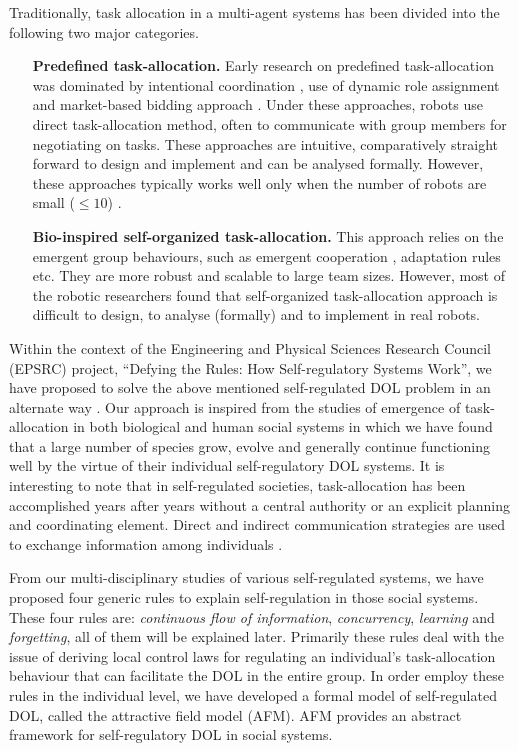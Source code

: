 \documentclass{intech}
\begin{document}
Traditionally, task allocation in a multi-agent systems has been divided into the following two major categories.
\begin{enumerate}
\item[\textbf{Predefined task-allocation.}]
Early research on predefined task-allocation was dominated by intentional coordination \citep{Parker2008}, use of dynamic role assignment \citep{Chaimowicz2002} and market-based bidding approach \citep{Dias+2006}. Under these approaches, robots use direct task-allocation method, often to communicate with group members for negotiating on tasks. These approaches are intuitive, comparatively straight forward to design and implement and can be analysed formally. However, these approaches typically works well only when the number of robots are small ($\leq 10$) \citep{Lerman+2006}.
%
\item[\textbf{Bio-inspired self-organized task-allocation.}]
This approach relies on the emergent group behaviours, such as emergent cooperation \citep{Kube+1993}, adaptation rules \citep{Liu+2007} etc. They are more robust and scalable to large team sizes. However, most of the robotic researchers found that self-organized task-allocation approach is difficult to design, to analyse (formally) and to implement in real robots. 
\end{enumerate}

Within the context of the Engineering and Physical Sciences Research Council (EPSRC) project, ``Defying the Rules: How Self-regulatory Systems Work'', we have proposed to solve the above mentioned self-regulated DOL problem in an alternate way \citep{Arcaute+2008}. Our approach is inspired from the studies of emergence of task-allocation in both biological and human social systems in which we have found that a large number of species grow, evolve and generally continue functioning well by the virtue of their individual self-regulatory DOL systems. It is interesting to note that in self-regulated societies, task-allocation has been accomplished years after years without a central authority or an explicit planning and coordinating element. Direct and indirect communication strategies are used to exchange information among individuals \citep{Camazine+2001}. 

From our multi-disciplinary studies of various self-regulated systems, we have proposed four generic rules to explain self-regulation in those social systems. These four rules are: \textit{continuous flow of information}, \textit{concurrency}, \textit{learning} and \textit{forgetting}, all of them will be explained later. Primarily these rules deal with the issue of deriving local control laws for regulating an individual's task-allocation behaviour that can facilitate the DOL in the entire group. In order employ these rules in the individual level, we have developed a formal model of self-regulated DOL, called the attractive field model (AFM). AFM provides an abstract framework for self-regulatory DOL in social systems. 
\end{document}
